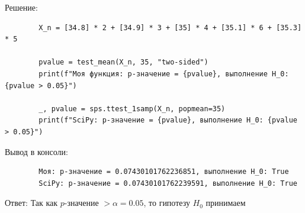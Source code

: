 \documentclass[a4paper,14pt]{extarticle}
\begin{document}
    Решение:
    \begin{verbatim}
        X_n = [34.8] * 2 + [34.9] * 3 + [35] * 4 + [35.1] * 6 + [35.3] * 5

        pvalue = test_mean(X_n, 35, "two-sided")
        print(f"Моя функция: p-значение = {pvalue}, выполнение H_0: {pvalue > 0.05}")

        _, pvalue = sps.ttest_1samp(X_n, popmean=35)
        print(f"SciPy: p-значение = {pvalue}, выполнение H_0: {pvalue > 0.05}")
    \end{verbatim}

    Вывод в консоли:
    \begin{verbatim}
        Моя: p-значение = 0.07430101762236851, выполнение H_0: True
        SciPy: p-значение = 0.07430101762239591, выполнение H_0: True
    \end{verbatim}

    Ответ: Так как $p$-значение $> \alpha = 0.05$, то гипотезу $H_0$ принимаем
\end{document}
